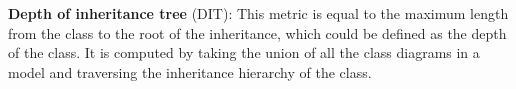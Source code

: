 
\textbf{Depth of inheritance tree} (DIT): This metric is equal to the maximum length from the class to the root of the inheritance, which could be defined as the depth of the class. It is computed by taking the union of all the class diagrams in a \umlS model and traversing the inheritance hierarchy of the class.

%

